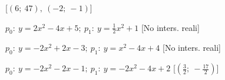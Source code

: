\begin{esercizio}
\begin{enumeratea}
   \hfill [$\left (6;~47 \right ),~\left (-2;~-1 \right )$]
  \item  $p_0:~y=2 x^2 -4 x +5;~p_1:~y=\frac{1}{2} x^2 +1$
   \hfill [No inters. reali]
  \item  $p_0:~y=-2 x^2 +2 x -3;~p_1:~y=x^2 -4 x +4$
   \hfill [No inters. reali]
  \item  $p_0:~y=-2 x^2 -2 x -1;~p_1:~y=-2 x^2 -4 x +2$
   \hfill [$\left (\frac{3}{2};~-\frac{17}{2} \right )$]
 \end{enumeratea}
\end{esercizio}

